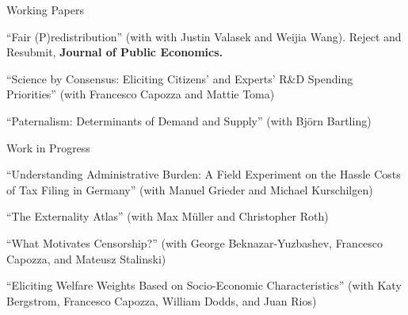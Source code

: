 \documentclass{resume} %
\begin{document}
\begin{rSection}{Working Papers}



  ``Fair (P)redistribution'' (with with Justin Valasek and Weijia Wang). Reject and Resubmit, \textbf{Journal of Public Economics.}

  ``Science by Consensus: Eliciting Citizens' and Experts' R\&D Spending Priorities'' (with Francesco Capozza and Mattie Toma) 

  ``Paternalism: Determinants of Demand and Supply'' (with Bj\"{o}rn Bartling)


\end{rSection}

\begin{rSection}{Work in Progress}

  ``Understanding Administrative Burden: A Field Experiment on the Hassle Costs of Tax Filing in Germany'' (with Manuel Grieder and Michael Kurschilgen)

  ``The Externality Atlas'' (with Max M\"{u}ller and Christopher Roth)
  
  ``What Motivates Censorship?'' (with George Beknazar-Yuzbashev, Francesco Capozza, and Mateusz Stalinski)

  ``Eliciting Welfare Weights Based on Socio-Economic Characteristics'' (with Katy Bergstrom, Francesco Capozza, William Dodds, and Juan Rios)
\end{rSection}
\end{document}
